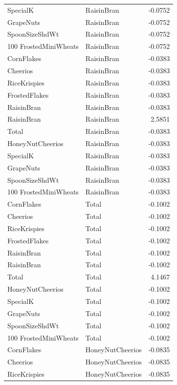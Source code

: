 \begin{longtable}{llr}
SpecialK & RaisinBran & -0.0752 \\
GrapeNuts & RaisinBran & -0.0752 \\
SpoonSizeShdWt & RaisinBran & -0.0752 \\
100%
FrostedMiniWheats & RaisinBran & -0.0752 \\
CornFlakes & RaisinBran & -0.0383 \\
Cheerios & RaisinBran & -0.0383 \\
RiceKrispies & RaisinBran & -0.0383 \\
FrostedFlakes & RaisinBran & -0.0383 \\
RaisinBran & RaisinBran & -0.0383 \\
RaisinBran & RaisinBran & 2.5851 \\
Total & RaisinBran & -0.0383 \\
HoneyNutCheerios & RaisinBran & -0.0383 \\
SpecialK & RaisinBran & -0.0383 \\
GrapeNuts & RaisinBran & -0.0383 \\
SpoonSizeShdWt & RaisinBran & -0.0383 \\
100%
FrostedMiniWheats & RaisinBran & -0.0383 \\
CornFlakes & Total & -0.1002 \\
Cheerios & Total & -0.1002 \\
RiceKrispies & Total & -0.1002 \\
FrostedFlakes & Total & -0.1002 \\
RaisinBran & Total & -0.1002 \\
RaisinBran & Total & -0.1002 \\
Total & Total & 4.1467 \\
HoneyNutCheerios & Total & -0.1002 \\
SpecialK & Total & -0.1002 \\
GrapeNuts & Total & -0.1002 \\
SpoonSizeShdWt & Total & -0.1002 \\
100%
FrostedMiniWheats & Total & -0.1002 \\
CornFlakes & HoneyNutCheerios & -0.0835 \\
Cheerios & HoneyNutCheerios & -0.0835 \\
RiceKrispies & HoneyNutCheerios & -0.0835 \\

\end{longtable}
